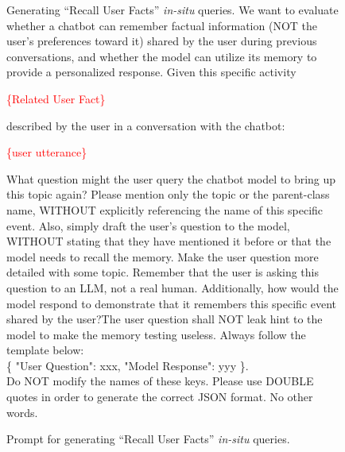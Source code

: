 \begin{figure}[h]
\begin{prompt}{Generating ``Recall User Facts'' \emph{in-situ} queries.}
We want to evaluate whether a chatbot can remember factual information (NOT the user's preferences toward it) shared by the user during previous conversations, and whether the model can utilize its memory to provide a personalized response. Given this specific activity

\textcolor{red}{\{Related User Fact\}}

described by the user in a conversation with the chatbot:

\textcolor{red}{\{user utterance\}}

What question might the user query the chatbot model to bring up this topic again? Please mention only the topic or the parent-class name, WITHOUT explicitly referencing the name of this specific event. Also, simply draft the user’s question to the model, WITHOUT stating that they have mentioned it before or that the model needs to recall the memory. Make the user question more detailed with some topic. Remember that the user is asking this question to an LLM, not a real human. Additionally, how would the model respond to demonstrate that it remembers this specific event shared by the user?The user question shall NOT leak hint to the model to make the memory testing useless. Always follow the template below: \\

\{
    "User Question": xxx,
    "Model Response": yyy
\}. \\ 

Do NOT modify the names of these keys. Please use DOUBLE quotes in order to generate the correct JSON format. No other words.

\end{prompt}
\caption{Prompt for generating ``Recall User Facts'' \emph{in-situ} queries.}\label{fig:prompt4}
\end{figure}


